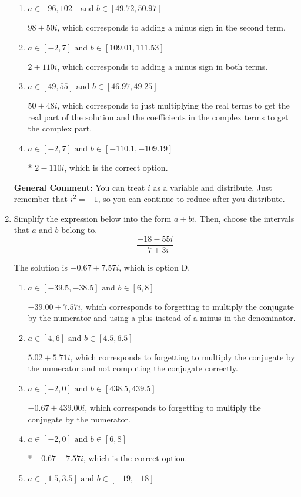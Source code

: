 \documentclass{extbook}[14pt]
\newcommand{\litem}[1]{\item #1

\rule{\textwidth}{0.4pt}}
\begin{document}
\begin{enumerate}
{\begin{enumerate}[label=\Alph*.]
 $98 - 50 i$, which corresponds to adding a minus sign in the first term.
\item \( a \in [96, 102] \text{ and } b \in [49.72, 50.97] \)

 $98 + 50 i$, which corresponds to adding a minus sign in the second term.
\item \( a \in [-2, 7] \text{ and } b \in [109.01, 111.53] \)

 $2 + 110 i$, which corresponds to adding a minus sign in both terms.
\item \( a \in [49, 55] \text{ and } b \in [46.97, 49.25] \)

 $50 + 48 i$, which corresponds to just multiplying the real terms to get the real part of the solution and the coefficients in the complex terms to get the complex part.
\item \( a \in [-2, 7] \text{ and } b \in [-110.1, -109.19] \)

* $2 - 110 i$, which is the correct option.
\end{enumerate}

\textbf{General Comment:} You can treat $i$ as a variable and distribute. Just remember that $i^2=-1$, so you can continue to reduce after you distribute.
}
\litem{
Simplify the expression below into the form $a+bi$. Then, choose the intervals that $a$ and $b$ belong to.
\[ \frac{-18 - 55 i}{-7 + 3 i} \]

The solution is \( -0.67  + 7.57 i \), which is option D.\begin{enumerate}[label=\Alph*.]
\item \( a \in [-39.5, -38.5] \text{ and } b \in [6, 8] \)

 $-39.00  + 7.57 i$, which corresponds to forgetting to multiply the conjugate by the numerator and using a plus instead of a minus in the denominator.
\item \( a \in [4, 6] \text{ and } b \in [4.5, 6.5] \)

 $5.02  + 5.71 i$, which corresponds to forgetting to multiply the conjugate by the numerator and not computing the conjugate correctly.
\item \( a \in [-2, 0] \text{ and } b \in [438.5, 439.5] \)

 $-0.67  + 439.00 i$, which corresponds to forgetting to multiply the conjugate by the numerator.
\item \( a \in [-2, 0] \text{ and } b \in [6, 8] \)

* $-0.67  + 7.57 i$, which is the correct option.
\item \( a \in [1.5, 3.5] \text{ and } b \in [-19, -18] \)


\end{enumerate}}
\end{enumerate}
\end{document}
